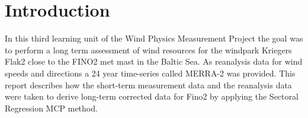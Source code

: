 \documentclass[10pt]{article}
\begin{document}




\onehalfspacing

\tableofcontents
\newpage
\section*{Introduction}
In this third learning unit of the Wind Physics Measurement Project the goal was to perform a long term assessment of wind resources for the windpark Kriegers Flak2 close to the FINO2 met mast in the Baltic Sea. As reanalysis data for wind speeds and directions a 24 year time-series called MERRA-2 was provided. This report describes how the short-term measurement data and the reanalysis data were taken to derive long-term corrected data for Fino2 by applying the Sectoral Regression MCP method.
 
\end{document}
